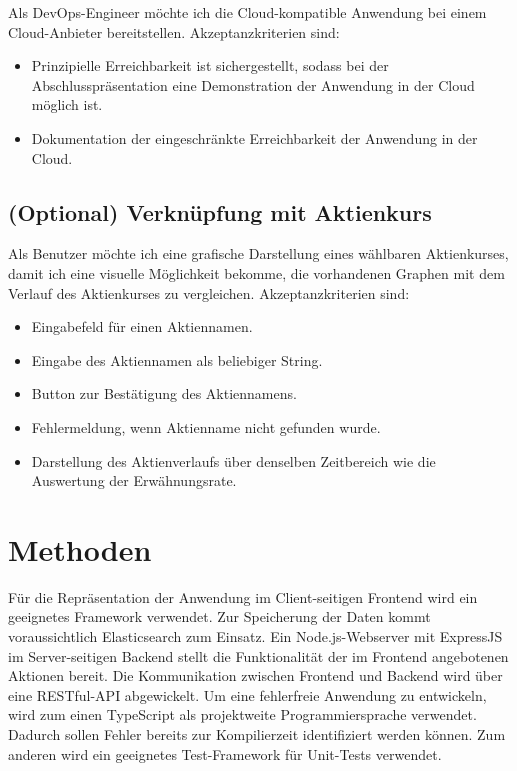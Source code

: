 \documentclass[a4paper, 10pt, conference]{IEEEtran}
\begin{document}
Als DevOps-Engineer möchte ich die Cloud-kompatible Anwendung bei einem Cloud-Anbieter bereitstellen.  Akzeptanzkriterien sind:
\begin{itemize}
\item Prinzipielle Erreichbarkeit ist sichergestellt, sodass bei der Abschlusspräsentation eine Demonstration der Anwendung in der Cloud möglich ist.
\item Dokumentation der eingeschränkte Erreichbarkeit der Anwendung in der Cloud.
\end{itemize}

\subsection{(Optional) Verknüpfung mit Aktienkurs}

Als Benutzer möchte ich eine grafische Darstellung eines wählbaren Aktienkurses, damit ich eine visuelle Möglichkeit bekomme, die vorhandenen Graphen mit dem Verlauf des Aktienkurses zu vergleichen. Akzeptanzkriterien sind:
\begin{itemize}
\item Eingabefeld für einen Aktiennamen.
\item Eingabe des Aktiennamen als beliebiger String.
\item Button zur Bestätigung des Aktiennamens.
\item Fehlermeldung, wenn Aktienname nicht gefunden wurde.
\item Darstellung des Aktienverlaufs über denselben Zeitbereich wie die Auswertung der Erwähnungsrate.
\end{itemize}

\section{Methoden} \label{s:methoden}

Für die Repräsentation der Anwendung im Client-seitigen Frontend wird ein geeignetes Framework verwendet. Zur Speicherung der Daten kommt voraussichtlich Elasticsearch zum Einsatz. Ein Node.js-Webserver mit ExpressJS im Server-seitigen Backend stellt die Funktionalität der im Frontend angebotenen Aktionen bereit. Die Kommunikation zwischen Frontend und Backend wird über eine RESTful-API abgewickelt. Um eine fehlerfreie Anwendung zu entwickeln, wird zum einen TypeScript als projektweite Programmiersprache verwendet. Dadurch sollen Fehler bereits zur Kompilierzeit identifiziert werden können. Zum anderen wird ein geeignetes Test-Framework für Unit-Tests verwendet.

\printbibliography
\end{document}
